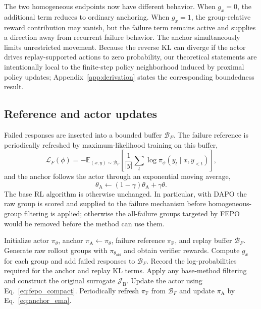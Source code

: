 \documentclass{article}
\newcommand{\pol}{\pi_\theta}
\newcommand{\oldpol}{\pi_{\theta_{\mathrm{old}}}}
\newcommand{\anchorpol}{\pi_{\mathrm A}}
\newcommand{\failpol}{\pi_{\mathrm F}}
\newcommand{\E}{\mathbb{E}}
\newcommand{\FEPO}{\textsc{FEPO}\xspace}
\begin{document}
The two homogeneous endpoints now have different behavior. When $g_x=0$, the additional term reduces to ordinary anchoring. When $g_x=1$, the group-relative reward contribution may vanish, but the failure term remains active and supplies a direction away from recurrent failure behavior. The anchor simultaneously limits unrestricted movement. Because the reverse KL can diverge if the actor drives replay-supported actions to zero probability, our theoretical statements are intentionally local to the finite-step policy neighborhood induced by proximal policy updates; Appendix~\ref{app:derivation} states the corresponding boundedness result.

\subsection{Reference and actor updates}
Failed responses are inserted into a bounded buffer $\mathcal B_F$. The failure reference is periodically refreshed by maximum-likelihood training on this buffer,
\begin{equation}
\mathcal L_F(\phi)
=-\E_{(x,y)\sim\mathcal B_F}\!\left[\frac{1}{|y|}\sum_t\log\pi_\phi(y_t\mid x,y_{<t})\right],
\label{eq:fail_sft}
\end{equation}
and the anchor follows the actor through an exponential moving average,
\begin{equation}
\theta_{\mathrm A}\leftarrow(1-\gamma)\theta_{\mathrm A}+\gamma\theta.
\label{eq:anchor_ema}
\end{equation}
The base RL algorithm is otherwise unchanged. In particular, with DAPO the raw group is scored and supplied to the failure mechanism before homogeneous-group filtering is applied; otherwise the all-failure groups targeted by \FEPO would be removed before the method can use them.

\begin{algorithm}[t]
\caption{Failure-Escape Policy Optimization}
\label{alg:fepo}
\begin{algorithmic}[1]
\STATE Initialize actor $\pol$, anchor $\anchorpol\leftarrow\pol$, failure reference $\failpol$, and replay buffer $\mathcal B_F$.
 \STATE Generate raw rollout groups with $\oldpol$ and obtain verifier rewards.
 \STATE Compute $g_x$ for each group and add failed responses to $\mathcal B_F$.
 \STATE Record the log-probabilities required for the anchor and replay KL terms.
 \STATE Apply any base-method filtering and construct the original surrogate $\mathcal J_{\mathrm B}$.
 \STATE Update the actor using Eq.~\eqref{eq:fepo_compact}.
 \STATE Periodically refresh $\failpol$ from $\mathcal B_F$ and update $\anchorpol$ by Eq.~\eqref{eq:anchor_ema}.
\ENDFOR
\end{algorithmic}
\end{algorithm}
\end{document}

